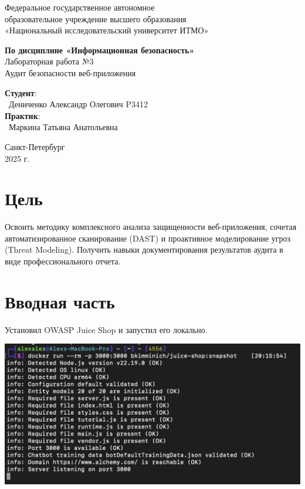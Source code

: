 \documentclass{article}
\begin{document}
\begin{center}
    \Large
    Федеральное государственное автономное \\
    образовательное учреждение высшего образования \\ 
    «Национальный исследовательский университет ИТМО»\\
    \vspace{0.5cm}
    \large
    
    \vspace{1cm}
    \Large
    \textbf{По дисциплине «Информационная безопасность»} \\
        Лабораторная работа №3\\
        Аудит безопасности веб-приложения
    \large
    \vspace{8cm}

    \begin{minipage}{.33\textwidth}
    \end{minipage}
    \hfill
    \begin{minipage}{.4\textwidth}
    
        \textbf{Студент}: \vspace{.1cm} \\
        \ Дениченко Александр Олегович P3412\\
        \textbf{Практик}:  \\
        \ Маркина Татьяна Анатольевна
    \end{minipage}
    \vfill
Санкт-Петербург\\ 2025 г.
\end{center}
\pagestyle{empty}
\newpage
\pagestyle{plain}

\section*{Цель}
Освоить методику комплексного анализа защищенности веб-приложения, сочетая
автоматизированное сканирование (DAST) и проактивное моделирование угроз (Threat Modeling).
Получить навыки документирования результатов аудита в виде профессионального отчета.

\section{Вводная часть}

Установил OWASP Juice Shop и запустил его локально.
\begin{center}
  \includegraphics[width=.9\textwidth]{start}
\end{center}
\end{document}
